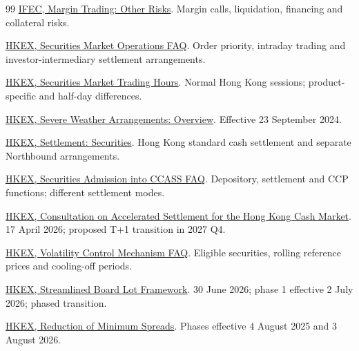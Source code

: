 \documentclass[11pt,a4paper]{article}
\begin{document}
\begin{thebibliography}{99}
 \href{https://www.ifec.org.hk/web/en/investment/market-intermediaries/financial-intermediaries/broker/margin-trading/other-risks.page}{IFEC, Margin Trading: Other Risks}. Margin calls, liquidation, financing and collateral risks.

 \href{https://www.hkex.com.hk/Global/Exchange/FAQ/Securities-Market/Trading/Securities-Market-Operations?sc_lang=en}{HKEX, Securities Market Operations FAQ}. Order priority, intraday trading and investor-intermediary settlement arrangements.

 \href{https://www.hkex.com.hk/Services/Trading-hours-and-Severe-Weather-Arrangements/Trading-Hours/Securities-Market?sc_lang=en}{HKEX, Securities Market Trading Hours}. Normal Hong Kong sessions; product-specific and half-day differences.

 \href{https://www.hkex.com.hk/services/trading-hours-and-severe-weather-arrangements/severe-weather-arrangements/overview?sc_lang=en}{HKEX, Severe Weather Arrangements: Overview}. Effective 23 September 2024.

 \href{https://www.hkex.com.hk/services/settlement-and-depository/settlement?sc_lang=en}{HKEX, Settlement: Securities}. Hong Kong standard cash settlement and separate Northbound arrangements.

 \href{https://www.hkex.com.hk/Services/Settlement-and-Depository/Securities-Admission-into-CCASS/FAQ?sc_lang=en}{HKEX, Securities Admission into CCASS FAQ}. Depository, settlement and CCP functions; different settlement modes.

 \href{https://www.hkex.com.hk/News/Market-Communications/2026/260417news?sc_lang=en}{HKEX, Consultation on Accelerated Settlement for the Hong Kong Cash Market}. 17 April 2026; proposed T+1 transition in 2027 Q4.

 \href{https://www.hkex.com.hk/Global/Exchange/FAQ/Securities-Market/Trading/VCM?sc_lang=en}{HKEX, Volatility Control Mechanism FAQ}. Eligible securities, rolling reference prices and cooling-off periods.

 \href{https://www.hkex.com.hk/News/Market-Communications/2026/260630news?sc_lang=en}{HKEX, Streamlined Board Lot Framework}. 30 June 2026; phase 1 effective 2 July 2026; phased transition.

 \href{https://www.hkex.com.hk/Services/Trading/Securities/Overview/Trading-Mechanism/Reduction-of-Minimum-Spreads?sc_lang=en}{HKEX, Reduction of Minimum Spreads}. Phases effective 4 August 2025 and 3 August 2026.


\end{thebibliography}
\end{document}
